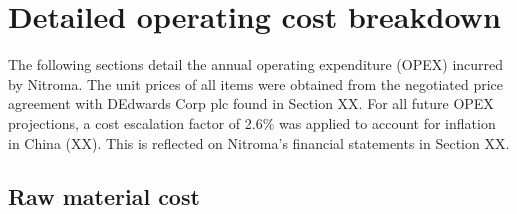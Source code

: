 \section{Detailed operating cost breakdown}
The following sections detail the annual operating expenditure (OPEX) incurred by Nitroma. The unit prices of all items were obtained from the negotiated price agreement with DEdwards Corp plc found in Section XX. For all future OPEX projections, a cost escalation factor of 2.6\% was applied to account for inflation in China (XX). This is reflected on Nitroma’s financial statements in Section XX.

\subsection{Raw material cost}
\label{sec:opex-raw-material}

